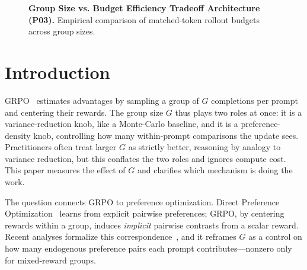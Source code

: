 \documentclass{article}
\begin{document}
\begin{figure}[htbp]
\centering
{}
\caption{\textbf{Group Size vs. Budget Efficiency Tradeoff Architecture (P03).} Empirical comparison of matched-token rollout budgets across group sizes.}
\label{fig:p3_group_size_tradeoff}
\end{figure}
\section{Introduction}
\label{sec:p3-intro}
GRPO~\citep{shao2024deepseekmath, guo2025deepseekr1} estimates advantages by
sampling a group of $G$ completions per prompt and centering their rewards. The
group size $G$ thus plays two roles at once: it is a variance-reduction knob, like
a Monte-Carlo baseline, and it is a preference-density knob, controlling how many
within-prompt comparisons the update sees. Practitioners often treat larger $G$ as
strictly better, reasoning by analogy to variance reduction, but this conflates the
two roles and ignores compute cost. This paper measures the effect of $G$ and
clarifies which mechanism is doing the work.

The question connects GRPO to preference optimization. Direct Preference
Optimization~\citep{rafailov2024direct} learns from explicit pairwise preferences;
GRPO, by centering rewards within a group, induces \emph{implicit} pairwise
contrasts from a scalar reward. Recent analyses formalize this
correspondence~\citep{wu2025grpo_dpo, liu2026gdpo}, and it reframes $G$ as a control
on how many endogenous preference pairs each prompt contributes---nonzero only for
mixed-reward groups.
\end{document}
